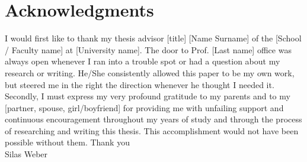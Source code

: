 \chapter*{Acknowledgments}

I would first like to thank my thesis advisor [title] [Name Surname] of the [School / Faculty name] at [University name]. 
The door to Prof. [Last name] office was always open whenever I ran into a trouble spot or had a question about my research or writing.
He/She consistently allowed this paper to be my own work, but steered me in the right the direction whenever he thought I needed it.
\\
Secondly, I must express my very profound gratitude to my parents and to my [partner, spouse, girl/boyfriend] for providing me with unfailing support and continuous encouragement throughout my years of study and through the process of researching and writing this thesis. 
This accomplishment would not have been possible without them. Thank you
\\
Silas Weber